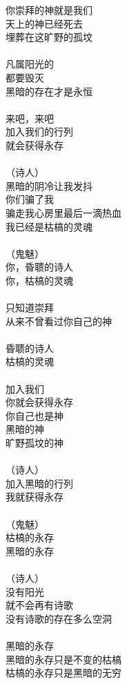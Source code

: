 你崇拜的神就是我们\\
天上的神已经死去\\
埋葬在这旷野的孤坟\\
\\
凡属阳光的\\
都要毁灭\\
黑暗的存在才是永恒\\
\\
来吧，来吧\\
加入我们的行列\\
就会获得永存\\
\\
（诗人）\\
黑暗的阴冷让我发抖\\
你们骗了我\\
骗走我心房里最后一滴热血\\
我已经是枯槁的灵魂\\
\\
（鬼魅）\\
你，昏聩的诗人\\
你，枯槁的灵魂\\
\\
只知道崇拜\\
从来不曾看过你自己的神\\
\\
昏聩的诗人\\
枯槁的灵魂\\
\\
加入我们\\
你就会获得永存\\
你自己也是神\\
黑暗的神\\
旷野孤坟的神\\
\\
（诗人）\\
加入黑暗的行列\\
我就获得永存\\
\\
（鬼魅）\\
枯槁的永存\\
黑暗的永存\\
\\
（诗人）\\
没有阳光\\
就不会再有诗歌\\
没有诗歌的存在多么空洞\\
\\
黑暗的永存\\
黑暗的永存只是不变的枯槁\\
枯槁的永存只是黑暗的无穷\\
